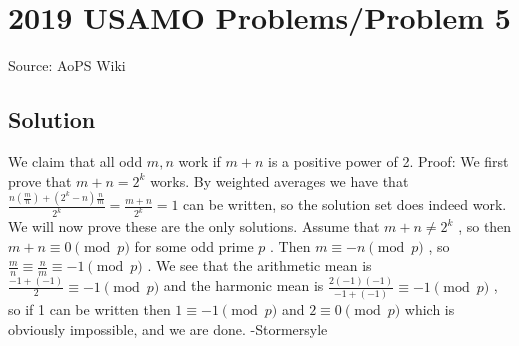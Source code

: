 \documentclass[12pt]{article}
\begin{document}
\section*{{2019 USAMO Problems/Problem 5}}
Source: AoPS Wiki

\subsection*{Solution}
We claim that all odd $m, n$ work if $m+n$ is a positive power of 2. Proof:
We first prove that $m+n=2^k$ works. By weighted averages we have that $\frac{n(\frac{m}{n})+(2^k-n)\frac{n}{m}}{2^k}=\frac{m+n}{2^k}=1$ can be written, so the solution set does indeed work. We will now prove these are the only solutions. Assume that $m+n\ne 2^k$ , so then $m+n\equiv 0\pmod{p}$ for some odd prime $p$ . Then $m\equiv -n\pmod{p}$ , so $\frac{m}{n}\equiv \frac{n}{m}\equiv -1\pmod{p}$ . We see that the arithmetic mean is $\frac{-1+(-1)}{2}\equiv -1\pmod{p}$ and the harmonic mean is $\frac{2(-1)(-1)}{-1+(-1)}\equiv -1\pmod{p}$ , so if 1 can be written then $1\equiv -1\pmod{p}$ and $2\equiv 0\pmod{p}$ which is obviously impossible, and we are done. -Stormersyle
\end{document}
